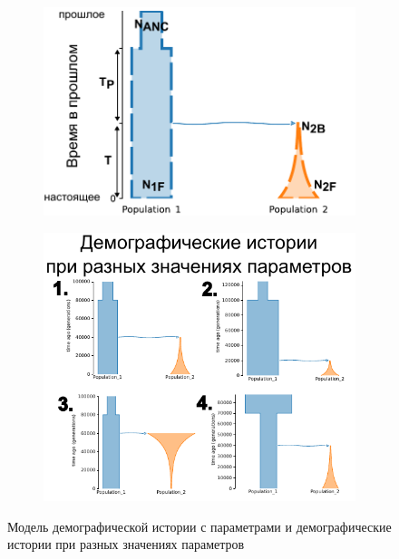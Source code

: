 \documentclass[a4paper,14pt,oneside,openany,article]{memoir}
\begin{document}
\begin{figure}[h]
    \centering
    \begin{subfigure}[c]{.5\textwidth}
    \includegraphics[width=\textwidth]{images_2/picture_2pops_model_1.pdf}
    \caption{}
    \label{fig:dadi:model_1}
    \end{subfigure}%
    \begin{subfigure}[c]{.49\textwidth}
    \includegraphics[width=\textwidth]{images_2/picture_2pops_model_1_2.pdf}
    \caption{}
    \label{fig:dadi:model_2}
    \end{subfigure}
    \caption{Модель демографической истории с параметрами и демографические истории при разных значениях параметров}
    \label{fig:dadi:model}
\end{figure}
\end{document}
